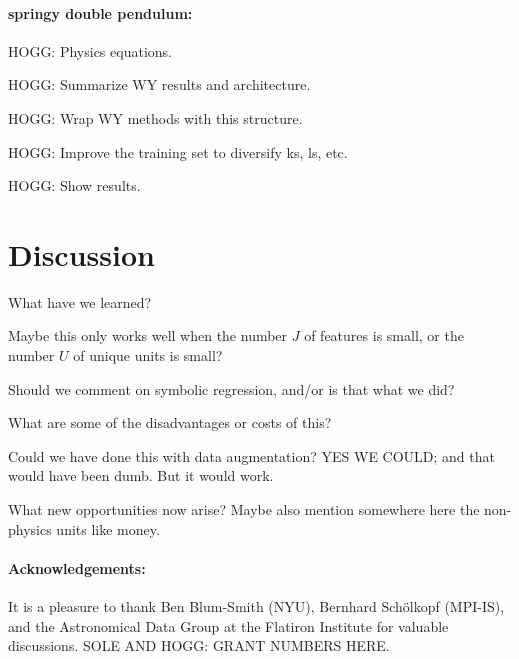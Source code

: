 \documentclass[12pt, letterpaper]{article}
\begin{document}
\paragraph{springy double pendulum:}
HOGG: Physics equations.

HOGG: Summarize WY results and architecture.

HOGG: Wrap WY methods with this structure.

HOGG: Improve the training set to diversify ks, ls, etc.

HOGG: Show results.

\section{Discussion}\label{sec:discussion}

What have we learned?

Maybe this only works well when the number $J$ of features is small, or the number $U$ of unique units is small?

Should we comment on symbolic regression, and/or is that what we did?

What are some of the disadvantages or costs of this?

Could we have done this with data augmentation? YES WE COULD; and that would have been dumb. But it would work.

What new opportunities now arise? Maybe also mention somewhere here the non-physics units like money.

\paragraph{Acknowledgements:}
It is a pleasure to thank
Ben Blum-Smith (NYU),
Bernhard Sch\"olkopf (MPI-IS),
and the Astronomical Data Group at the Flatiron Institute for valuable discussions.
SOLE AND HOGG: GRANT NUMBERS HERE.
\end{document}
